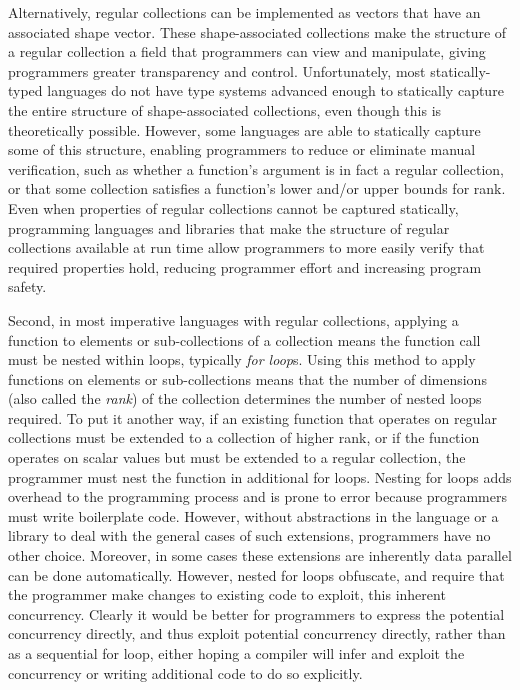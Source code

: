 Alternatively, regular collections can be implemented as vectors that have an associated shape vector. 
These shape-associated collections make the structure of a regular collection 
a field that programmers can view and manipulate, giving programmers greater transparency and control.
Unfortunately, most statically-typed languages do not have type systems advanced enough 
to statically capture the entire structure of shape-associated collections, 
even though this is theoretically possible. %
However, some languages are able to statically capture some of this structure, 
enabling programmers to reduce or eliminate manual verification, 
such as whether a function's argument is in fact a regular collection,
or that some collection satisfies a function's lower and/or upper bounds for rank\cite{boost}\cite{sac}\cite{dph}.
Even when properties of regular collections cannot be captured statically, 
programming languages and libraries that make the structure of regular collections available at run time 
allow programmers to more easily verify that required properties hold, 
reducing programmer effort and increasing program safety.

Second, in most imperative languages with regular collections, 
applying a function to elements or sub-collections of a collection means 
the function call must be nested within loops, typically \textit{for loop}s.
Using this method to apply functions on elements or sub-collections means that 
the number of dimensions (also called the \textit{rank}) of the collection 
determines the number of nested loops required.
To put it another way, if an existing function that operates on regular collections 
must be extended to a collection of higher rank, 
or if the function operates on scalar values but must be extended to a regular collection, 
the programmer must nest the function in additional for loops.
Nesting for loops adds overhead to the programming process 
and is prone to error because programmers must write boilerplate code.
However, without abstractions in the language or a library 
to deal with the general cases of such extensions, programmers have no other choice.
Moreover, in some cases these extensions are inherently data parallel can be done automatically.
However, nested for loops obfuscate,
and require that the programmer make changes to existing code to exploit, this inherent concurrency. 
Clearly it would be better for programmers to express the potential concurrency directly, 
and thus exploit potential concurrency directly, 
rather than as a sequential for loop, either hoping a compiler will infer and exploit the concurrency 
or writing additional code to do so explicitly.

